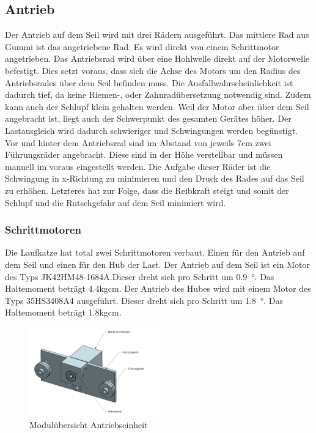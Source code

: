 \documentclass[a4paper]{report}
\begin{document}
\subsection{Antrieb}
Der Antrieb auf dem Seil wird mit drei Rädern ausgeführt. Das mittlere Rad aus Gummi ist das angetriebene Rad. Es wird direkt von einem Schrittmotor angetrieben. Das Antriebsrad wird über eine Hohlwelle direkt auf der Motorwelle befestigt. Dies setzt voraus, dass sich die Achse des Motors um den Radius des Antriebsrades über dem Seil befinden muss. Die Ausfallwahrscheinlichkeit ist dadurch tief, da keine Riemen-, oder Zahnradübersetzung notwendig sind. Zudem kann auch der Schlupf klein gehalten werden. Weil der Motor aber über dem Seil angebracht ist, liegt auch der Schwerpunkt des gesamten Gerätes höher. Der Lastausgleich wird dadurch schwieriger und Schwingungen werden begünstigt.
\\
Vor und hinter dem Antriebsrad sind im Abstand von jeweils 7cm zwei Führungsräder angebracht. Diese sind in der Höhe verstellbar und müssen manuell im voraus eingestellt werden. Die Aufgabe dieser Räder ist die Schwingung in x-Richtung zu minimieren und den Druck des Rades auf das Seil zu erhöhen. Letzteres hat zur Folge, dass die Reibkraft steigt und somit der Schlupf und die Rutschgefahr auf dem Seil minimiert wird.

\subsubsection{Schrittmotoren}
\label{sssec:Schrittmotoren}
Die Laufkatze hat total zwei Schrittmotoren verbaut. Einen für den Antrieb auf dem Seil und einen für den Hub der Last. Der Antrieb auf dem Seil ist ein Motor des Typs JK42HM48-1684A.Dieser dreht sich pro Schritt um \SI{0.9}{\degree}. Das Haltemoment beträgt 4.4kgcm. Der Antrieb des Hubes wird mit einem Motor des Typs 35HS3408A4 ausgeführt. Dieser dreht sich pro Schritt um \SI{1.8}{\degree}. Das Haltemoment beträgt 1.8kgcm.

\begin{figure}[h!]
	\centering
	\includegraphics[keepaspectratio,width=0.5\textwidth]{Antriebseinheit}
	\caption{Modulübersicht Antriebseinheit	}
	\label{fig:SystemArchitektur}
\end{figure}
\end{document}
